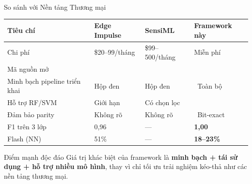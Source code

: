 \documentclass[aspectratio=169,12pt]{beamer}
\newcommand{\cmark}{\textcolor{green!60!black}{\ding{51}}}
\newcommand{\xmark}{\textcolor{red!70!black}{\ding{55}}}
\begin{document}

\begin{frame}{So sánh với Nền tảng Thương mại}
  \begin{center}
  \scriptsize
  \setlength{\tabcolsep}{4pt}
  \begin{tabular}{@{}p{3.4cm}p{2.0cm}p{2.0cm}p{2.4cm}@{}}
    \toprule
    \textbf{Tiêu chí} & \textbf{Edge Impulse} & \textbf{SensiML} & \textbf{Framework này} \\
    \midrule
    Chi phí & \$20--99/tháng & \$99--500/tháng & Miễn phí \\
    Mã nguồn mở & \xmark & \xmark & \cmark \\
    Minh bạch pipeline triển khai & Hộp đen & Hộp đen & \cmark\ Toàn bộ \\
    Hỗ trợ RF/SVM & Giới hạn & Có chọn lọc & \cmark \\
    Đảm bảo parity & Không rõ & Không rõ & \cmark\ Bit-exact \\
    \midrule
    F1 trên 3 lớp & 0,96 & --- & \textbf{1,00} \\
    Flash (NN) & 51\% & --- & \textbf{18--23\%} \\
    \bottomrule
  \end{tabular}
  \end{center}

  \vspace{2pt}
  \begin{exampleblock}{\small Điểm mạnh độc đáo}
    \small Giá trị khác biệt của framework là \textbf{minh bạch + tái sử dụng + hỗ trợ nhiều mô hình}, thay vì chỉ tối ưu trải nghiệm kéo-thả như các nền tảng thương mại.
  \end{exampleblock}
\end{frame}

\end{document}
